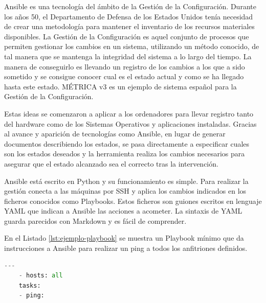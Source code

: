 Ansible es una tecnología del ámbito de la Gestión de la Configuración. Durante los años 50, el Departamento de Defensa de los Estados Unidos tenía necesidad de crear una metodología para mantener el inventario de los recursos materiales disponibles. La Gestión de la Configuración es aquel conjunto de procesos que permiten gestionar los cambios en un sistema, utilizando un método conocido, de tal manera que se mantenga la integridad del sistema a lo largo del tiempo. La manera de conseguirlo es llevando un registro de los cambios a los que a sido sometido y se consigue conocer cual es el estado actual y como se ha llegado hasta este estado. MÉTRICA v3 es un ejemplo de sistema español para la Gestión de la Configuración.

Estas ideas se comenzaron a aplicar a los ordenadores para llevar registro tanto del hardware como de los Sistemas Operativos y aplicaciones instaladas. Gracias al avance y aparición de tecnologías como Ansible, en lugar de generar documentos describiendo los estados, se pasa directamente a especificar cuales son los estados deseados y la herramienta realiza los cambios necesarios para asegurar que el estado alcanzado sea el correcto tras la intervención.

Ansible está escrito en Python y su funcionamiento es simple. Para realizar la gestión conecta a las máquinas por SSH y aplica los cambios indicados en los ficheros conocidos como Playbooks. Estos ficheros son guiones escritos en lenguaje YAML que indican a Ansible las acciones a acometer. La sintaxis de YAML guarda parecidos con Markdown y es fácil de comprender.

En el Listado \ref{lst:ejemplo-playbook} se muestra un Playbook mínimo que da instrucciones a Ansible para realizar un ping a todos los anfitriones definidos.

\begin{lstlisting}[language=Python,caption={Ejemplo mínimo de Playbook},label=lst:ejemplo-playbook]
    ---
    - hosts: all
    tasks:
    - ping:
\end{lstlisting}